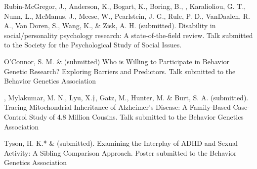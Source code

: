 

\item Rubin-McGregor, J., Anderson, K., Bogart, K., Boring, B., \meb, Karalioliou, G. T., Nunn, L., McManus, J., Meese, W., Pearlstein, J. G., Rule, P. D., VanDaalen, R. A., Van Doren, S., Wang, K., & Zisk, A. H. (submitted). Disability in social/personality psychology research: A state-of-the-field review. Talk submitted to the Society for the Psychological Study of Social Issues. 

\item O'Connor, S. M. \& \meb (submitted) Who is Willing to Participate in Behavior Genetic Research? Exploring Barriers and Predictors. Talk submitted to the Behavior Genetics Association
\item \meb, Mylakumar, M. N., Lyu, X.$\dagger$, Gatz, M., Hunter, M. \& Burt, S. A. (submitted). Tracing Mitochondrial Inheritance of Alzheimer's Disease: A Family-Based Case-Control Study of 4.8 Million Cousins. Talk submitted to the Behavior Genetics Association
\item Tyson, H. K.* \& \meb (submitted). Examining the Interplay of ADHD and Sexual Activity: A Sibling Comparison Approach. Poster submitted to the Behavior Genetics Association


